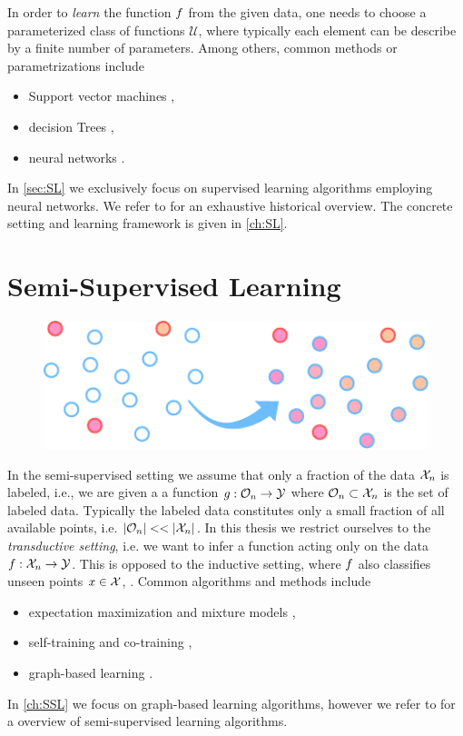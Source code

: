 In order to \emph{learn} the function $f$ from the given data, one needs to choose a parameterized class of functions $\mathcal{U}$, where typically each element can be describe by a finite number of parameters. Among others, common methods or parametrizations include
%
\begin{itemize}
\item Support vector machines \cite{cortes1995support, scholkopf2005support},
\item decision Trees \cite{morgan1963problems, Brei},
\item neural networks \cite{Turing,rosenblatt1958perceptron, minsky1969introduction}.
\end{itemize}
%
In \cref{sec:SL} we exclusively focus on supervised learning algorithms employing neural networks. We refer to \cite{SCHMIDHUBER201585} for an exhaustive historical overview. The concrete setting and learning framework is given in \cref{ch:SL}.
%
%
%
\section{Semi-Supervised Learning}\label{sec:PSSL}
\begin{figure}
\centering
\includegraphics[width=.5\textwidth]{atelier/paradigms/SSL.pdf}
\end{figure}
%
In the semi-supervised setting we assume that only a fraction of the data $\mathcal{X}_n$ is labeled, i.e., we are given a a function $g:\mathcal{O}_n\to\mathcal{\mathcal{Y}}$ where $\mathcal{O}_n\subset\mathcal{X}_n$ is the set of labeled data. Typically the labeled data constitutes only a small fraction of all available points, i.e. $\left|\mathcal{O}_n\right|<<\left|\mathcal{X}_n\right|$. In this thesis we restrict ourselves to the \emph{transductive setting}, i.e. we want to infer a function acting only on the data $f: \mathcal{X}_n\to \mathcal{\mathcal{Y}}$. This is opposed to the inductive setting, where $f$ also classifies unseen points $x\in\mathcal{X}$, \cite{zhu2005semi}. Common algorithms and methods include
%
\begin{itemize}
\item expectation maximization and mixture models \cite{dempster1977maximum,cozman2003semi},
\item self-training and co-training \cite{blum1998combining},
\item graph-based learning \cite{zhu2005semi}.
\end{itemize}
%
%
In \cref{ch:SSL} we focus on graph-based learning algorithms, however we refer to \cite{zhu2005semi} for a overview of semi-supervised learning algorithms.
